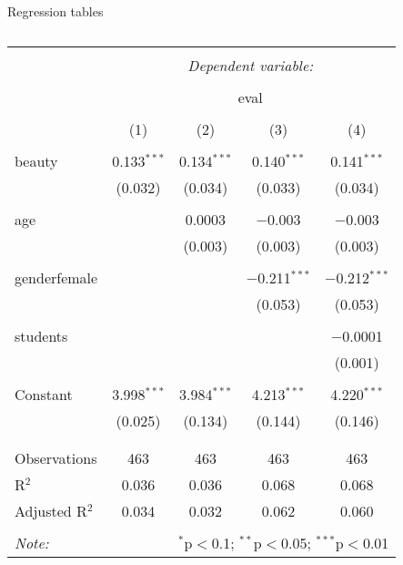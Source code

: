 \documentclass[
  10pt,
  ignorenonframetext,
]{beamer}
\begin{document}
\begin{frame}{Regression tables}
\protect\hypertarget{regression-tables-1}{}

\def\arraystretch{0.7}

\begin{table}[!htbp] \centering 
  \caption{} 
  \label{} 
\footnotesize 
\begin{tabular}{@{\extracolsep{0pt}}lcccc} 
\\[-1.8ex]\hline 
\hline \\[-1.8ex] 
 & \multicolumn{4}{c}{\textit{Dependent variable:}} \\ 
\cline{2-5} 
\\[-1.8ex] & \multicolumn{4}{c}{eval} \\ 
\\[-1.8ex] & (1) & (2) & (3) & (4)\\ 
\hline \\[-1.8ex] 
 beauty & 0.133$^{***}$ & 0.134$^{***}$ & 0.140$^{***}$ & 0.141$^{***}$ \\ 
  & (0.032) & (0.034) & (0.033) & (0.034) \\ 
  & & & & \\ 
 age &  & 0.0003 & $-$0.003 & $-$0.003 \\ 
  &  & (0.003) & (0.003) & (0.003) \\ 
  & & & & \\ 
 genderfemale &  &  & $-$0.211$^{***}$ & $-$0.212$^{***}$ \\ 
  &  &  & (0.053) & (0.053) \\ 
  & & & & \\ 
 students &  &  &  & $-$0.0001 \\ 
  &  &  &  & (0.001) \\ 
  & & & & \\ 
 Constant & 3.998$^{***}$ & 3.984$^{***}$ & 4.213$^{***}$ & 4.220$^{***}$ \\ 
  & (0.025) & (0.134) & (0.144) & (0.146) \\ 
  & & & & \\ 
\hline \\[-1.8ex] 
Observations & 463 & 463 & 463 & 463 \\ 
R$^{2}$ & 0.036 & 0.036 & 0.068 & 0.068 \\ 
Adjusted R$^{2}$ & 0.034 & 0.032 & 0.062 & 0.060 \\ 
\hline 
\hline \\[-1.8ex] 
\textit{Note:}  & \multicolumn{4}{r}{$^{*}$p$<$0.1; $^{**}$p$<$0.05; $^{***}$p$<$0.01} \\ 
\end{tabular} 
\end{table}


\end{frame}
\end{document}
